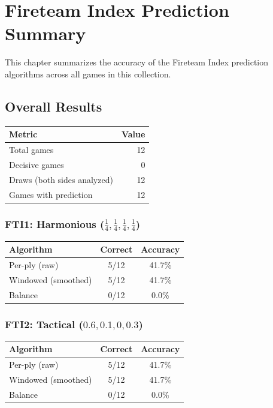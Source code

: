 \documentclass[11pt]{book}
\begin{document}
\chapter{Fireteam Index Prediction Summary}

This chapter summarizes the accuracy of the Fireteam Index prediction algorithms across all games in this collection.

\section{Overall Results}

\begin{tabular}{lr}
\toprule
\textbf{Metric} & \textbf{Value} \\
\midrule
Total games & 12 \\
Decisive games & 0 \\
Draws (both sides analyzed) & 12 \\
Games with prediction & 12 \\
\bottomrule
\end{tabular}

\subsection{FTI1: Harmonious ($\frac{1}{4}, \frac{1}{4}, \frac{1}{4}, \frac{1}{4}$)}

\begin{tabular}{lcc}
\toprule
\textbf{Algorithm} & \textbf{Correct} & \textbf{Accuracy} \\
\midrule
Per-ply (raw) & 5/12 & 41.7\% \\
Windowed (smoothed) & 5/12 & 41.7\% \\
Balance & 0/12 & 0.0\% \\
\bottomrule
\end{tabular}

\subsection{FTI2: Tactical ($0.6, 0.1, 0, 0.3$)}

\begin{tabular}{lcc}
\toprule
\textbf{Algorithm} & \textbf{Correct} & \textbf{Accuracy} \\
\midrule
Per-ply (raw) & 5/12 & 41.7\% \\
Windowed (smoothed) & 5/12 & 41.7\% \\
Balance & 0/12 & 0.0\% \\
\bottomrule
\end{tabular}
\end{document}
